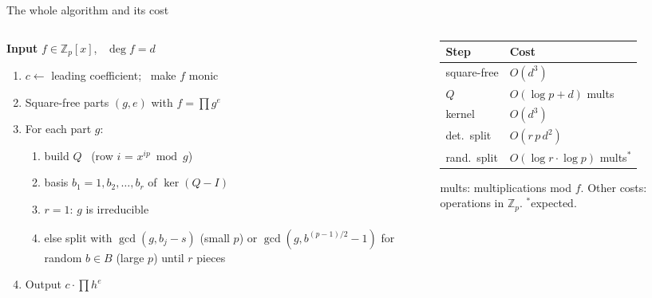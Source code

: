 \documentclass[aspectratio=169,11pt]{beamer}
\newcommand{\Zp}{\mathbb{Z}_p}
\newcommand{\Zpx}{\mathbb{Z}_p[x]}
\newcommand{\aside}[1]{{\color{muted}\small #1}}
\begin{document}
\begin{frame}{The whole algorithm and its cost}
  \begin{columns}[T]
    \begin{column}{0.56\textwidth}
      \small
      \textbf{Input} $f \in \Zpx$, \ $\deg f = d$
      \begin{enumerate}
        \item $c \leftarrow$ leading coefficient; \ make $f$ monic
        \item Square-free parts $(g, e)$ with $f = \prod g^e$
        \item For each part $g$:
          \begin{enumerate}
            \item build $Q$ \ (row $i$ = $x^{ip} \bmod g$)
            \item basis $b_1 = 1, b_2, \dots, b_r$ of $\ker(Q - I)$
            \item $r = 1$: $g$ is irreducible
            \item else split with $\gcd(g, b_j - s)$ (small $p$) or $\gcd(g, b^{(p-1)/2} - 1)$ for random $b \in B$ (large $p$) until $r$ pieces
          \end{enumerate}
        \item Output $c \cdot \prod h^e$
      \end{enumerate}
    \end{column}
    \begin{column}{0.40\textwidth}
      \small
      \begin{tabular}{@{}ll@{}}
        \toprule
        Step & Cost \\
        \midrule
        square-free & $O(d^3)$ \\
        $Q$ & $O(\log p + d)$ mults \\
        kernel & $O(d^3)$ \\
        det.\ split & $O(r\,p\,d^2)$ \\
        rand.\ split & $O(\log r \cdot \log p)$ mults$^{*}$ \\
        \bottomrule
      \end{tabular}
      \par\medskip
      \aside{mults: multiplications mod $f$. Other costs: operations in $\Zp$. $^{*}$expected.}
    \end{column}
  \end{columns}
\end{frame}
\end{document}
